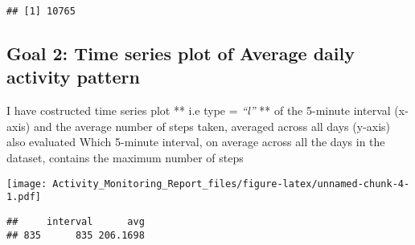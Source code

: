 \documentclass[]{article}
\newenvironment{Shaded}{\begin{snugshade}}{\end{snugshade}}
\newcommand{\KeywordTok}[1]{\textcolor[rgb]{0.13,0.29,0.53}{\textbf{#1}}}
\newcommand{\DataTypeTok}[1]{\textcolor[rgb]{0.13,0.29,0.53}{#1}}
\newcommand{\StringTok}[1]{\textcolor[rgb]{0.31,0.60,0.02}{#1}}
\newcommand{\OtherTok}[1]{\textcolor[rgb]{0.56,0.35,0.01}{#1}}
\newcommand{\OperatorTok}[1]{\textcolor[rgb]{0.81,0.36,0.00}{\textbf{#1}}}
\newcommand{\NormalTok}[1]{#1}
\begin{document}
\begin{verbatim}
## [1] 10765
\end{verbatim}

\subsection{Goal 2: Time series plot of Average daily activity
pattern}\label{goal-2-time-series-plot-of-average-daily-activity-pattern}

I have costructed time series plot ** i.e type = \emph{``l''} ** of the
5-minute interval (x-axis) and the average number of steps taken,
averaged across all days (y-axis) also evaluated Which 5-minute
interval, on average across all the days in the dataset, contains the
maximum number of steps

\begin{Shaded}
\end{Shaded}

\texttt{[image: Activity\_Monitoring\_Report\_files/figure-latex/unnamed-chunk-4-1.pdf]}

\begin{Shaded}
\end{Shaded}

\begin{verbatim}
##     interval      avg
## 835      835 206.1698
\end{verbatim}
\end{document}
